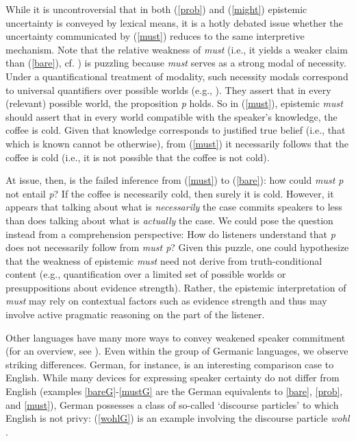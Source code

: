 \documentclass[11pt]{article}
\begin{document}
While it is uncontroversial that in both (\ref{prob}) and (\ref{might}) epistemic uncertainty is conveyed by lexical means, it is a hotly debated issue whether the uncertainty communicated by (\ref{must}) reduces to the same interpretive mechanism. Note that the relative weakness of \emph{must} (i.e., it yields a weaker claim than (\ref{bare}), cf. \citealp{karttunen1972}) is puzzling because \emph{must} serves as a strong modal of necessity. Under a quantificational treatment of modality, such necessity modals correspond to universal quantifiers over possible worlds (e.g., \citealp{kratzer1991}). They assert that in every (relevant) possible world, the proposition \emph{p} holds. So in (\ref{must}), epistemic \emph{must} should assert that in every world compatible with the speaker's knowledge, the coffee is cold. Given that knowledge corresponds to justified true belief (i.e., that which is known cannot be otherwise), from (\ref{must}) it necessarily follows that the coffee is cold (i.e., it is not possible that the coffee is not cold).

At issue, then, is the failed inference from (\ref{must}) to (\ref{bare}): how could \emph{must p} not entail \emph{p}? If the coffee is necessarily cold, then surely it is cold. However, it appears that talking about what is \emph{necessarily} the case commits speakers to less than does talking about what is \emph{actually} the case. We could pose the question instead from a comprehension perspective: How do listeners understand that \emph{p} does not necessarily follow from \emph{must p}? Given this puzzle, one could hypothesize that the weakness of epistemic \emph{must} need not derive from truth-conditional content (e.g., quantification over a limited set of possible worlds or presuppositions about evidence strength). Rather, the epistemic interpretation of \emph{must} may rely on contextual factors such as evidence strength and thus may involve active pragmatic reasoning on the part of the listener.

Other languages have many more ways to convey weakened speaker commitment (for an overview, see \citealp{Aikhenvald2004,Drubig2001,Nuyts2001}). Even within the group of Germanic languages, we observe striking differences. German, for instance, is an interesting comparison case to English. While many devices for expressing speaker certainty do not differ from English (examples \ref{bareG}-\ref{mustG} are the German equivalents to \ref{bare}, \ref{prob}, and \ref{must}), German possesses a class of so-called `discourse particles' to which English is not privy: (\ref{wohlG}) is an example involving the discourse particle \emph{wohl} \citep{Zimmermann2004}. 
\end{document}
